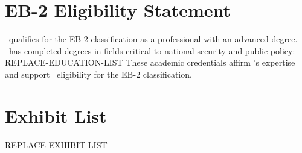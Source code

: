 \documentclass{pl_template}  %
\begin{document}
\section{EB-2 Eligibility Statement}
\Petitioner \  qualifies for the EB-2 classification as a professional with an advanced degree. \HeSheUp \ has completed degrees in fields critical to national security and public policy: 
REPLACE-EDUCATION-LIST
These academic credentials affirm \Petitioner’s expertise and support \HisHerLow \ eligibility for the EB-2 classification.




\vspace{2em}

\section*{Exhibit List}
REPLACE-EXHIBIT-LIST
 
\end{document}
